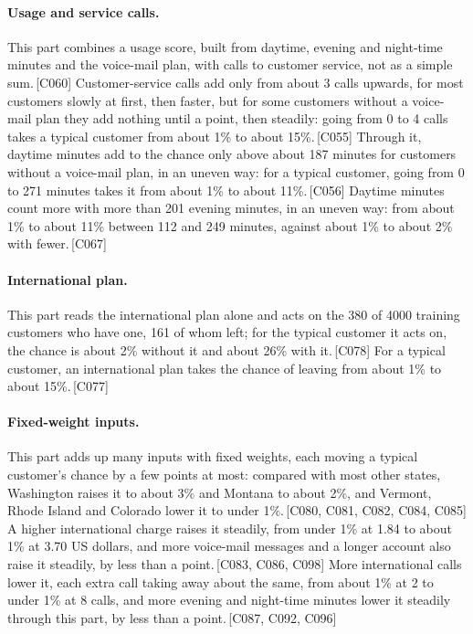 \documentclass[a4paper,10pt]{article}
\newif\ifreviewmarks
\newcommand{\reviewrule}{\noindent{\color{BrickRed}\rule{\linewidth}{0.8pt}}}
\newenvironment{drafted}[1][]{%
  \ifreviewmarks\par\addvspace{\medskipamount}\reviewrule\par\nopagebreak
  \noindent{\color{BrickRed}\sffamily\footnotesize\textbf{Thesis Draft}\quad #1\hfill review}\par\nopagebreak\smallskip\fi}{%
  \ifreviewmarks\par\smallskip\noindent{\color{BrickRed}\sffamily\footnotesize end of thesis draft}\par\nopagebreak\reviewrule\par\medskip\fi}
\begin{document}
\begin{drafted}[plain-language layer: churn100-s7-c1]
\paragraph{Usage and service calls.} This part combines a usage score, built from daytime, evening and night-time minutes and the voice-mail plan, with calls to customer service, not as a simple sum.\,{\scriptsize\textcolor{NavyBlue}{[C060]}} Customer-service calls add only from about 3 calls upwards, for most customers slowly at first, then faster, but for some customers without a voice-mail plan they add nothing until a point, then steadily: going from 0 to 4 calls takes a typical customer from about 1\% to about 15\%.\,{\scriptsize\textcolor{NavyBlue}{[C055]}} Through it, daytime minutes add to the chance only above about 187 minutes for customers without a voice-mail plan, in an uneven way: for a typical customer, going from 0 to 271 minutes takes it from about 1\% to about 11\%.\,{\scriptsize\textcolor{NavyBlue}{[C056]}} Daytime minutes count more with more than 201 evening minutes, in an uneven way: from about 1\% to about 11\% between 112 and 249 minutes, against about 1\% to about 2\% with fewer.\,{\scriptsize\textcolor{NavyBlue}{[C067]}}
\paragraph{International plan.} This part reads the international plan alone and acts on the 380 of 4000 training customers who have one, 161 of whom left; for the typical customer it acts on, the chance is about 2\% without it and about 26\% with it.\,{\scriptsize\textcolor{NavyBlue}{[C078]}} For a typical customer, an international plan takes the chance of leaving from about 1\% to about 15\%.\,{\scriptsize\textcolor{NavyBlue}{[C077]}}
\paragraph{Fixed-weight inputs.} This part adds up many inputs with fixed weights, each moving a typical customer's chance by a few points at most: compared with most other states, Washington raises it to about 3\% and Montana to about 2\%, and Vermont, Rhode Island and Colorado lower it to under 1\%.\,{\scriptsize\textcolor{NavyBlue}{[C080, C081, C082, C084, C085]}} A higher international charge raises it steadily, from under 1\% at 1.84 to about 1\% at 3.70 US dollars, and more voice-mail messages and a longer account also raise it steadily, by less than a point.\,{\scriptsize\textcolor{NavyBlue}{[C083, C086, C098]}} More international calls lower it, each extra call taking away about the same, from about 1\% at 2 to under 1\% at 8 calls, and more evening and night-time minutes lower it steadily through this part, by less than a point.\,{\scriptsize\textcolor{NavyBlue}{[C087, C092, C096]}}

\end{drafted}
\end{document}
